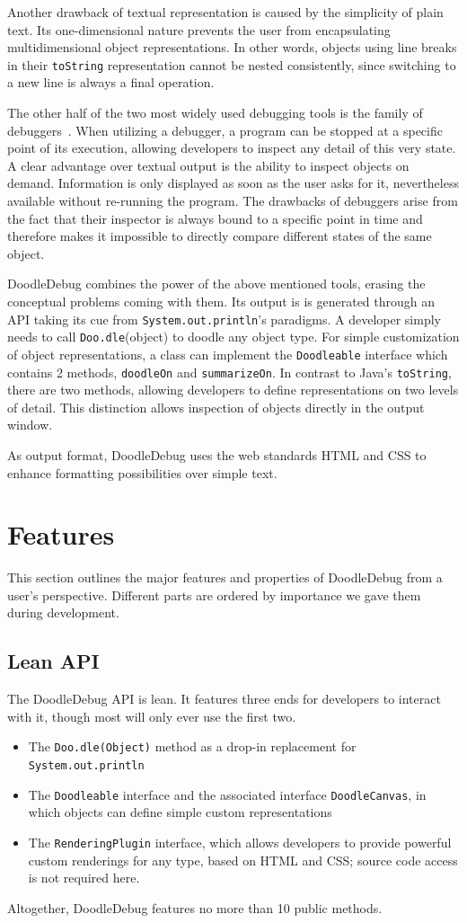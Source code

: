\documentclass[english]{scrartcl}
\newcommand{\DD}{Dood\-le\-De\-bug\xspace}
\newcommand{\Doodle}{\texttt{Doo.\-dle}\xspace}
\newcommand{\println}{\texttt{Sys\-tem.\-out.\-println}\xspace}
\begin{document}
Another drawback of textual representation is caused by the simplicity of plain text.
Its one-dimensional nature prevents the user from encapsulating multidimensional object representations.
In other words, objects using line breaks in their \texttt{toString} representation cannot be nested consistently, since switching to a new line is always a final operation.

The other half of the two most widely used debugging tools is the family of debuggers~\cite{Kras88a}.
When utilizing a debugger, a program can be stopped at a specific point of its execution, allowing developers to inspect any detail of this very state.
A clear advantage over textual output is the ability to inspect objects on demand.
Information is only displayed as soon as the user asks for it, nevertheless available without re-running the program.
The drawbacks of debuggers arise from the fact that their inspector is always bound to a specific point in time and therefore makes it impossible to directly compare different states of the same object.

\DD combines the power of the above mentioned tools, erasing the conceptual problems coming with them.
Its output is is generated through an API taking its cue from \println's paradigms.
A developer simply needs to call \Doodle(object) to doodle any object type.
For simple customization of object representations, a class can implement the \texttt{Doodleable} interface which contains 2 methods, \texttt{doodleOn} and \texttt{summarizeOn}.
In contrast to Java's \texttt{toString}, there are two methods, allowing developers to define representations on two levels of detail.
This distinction allows inspection of objects directly in the output window.

As output format, \DD uses the web standards HTML and CSS to enhance formatting possibilities over simple text.


\section{Features}
This section outlines the major features and properties of DoodleDebug from a user's perspective.
Different parts are ordered by importance we gave them during development.

\subsection{Lean API}
The \DD API is lean.
It features three ends for developers to interact with it, though most will only ever use the first two.
\begin{itemize}
\item The \texttt{Doo.dle(Object)} method as a drop-in replacement for \println
\item The \texttt{Doodleable} interface and the associated interface \texttt{DoodleCanvas}, in which objects can define simple custom representations
\item The \texttt{RenderingPlugin} interface, which allows developers to provide powerful custom renderings for any type, based on HTML and CSS; source code access is not required here.
\end{itemize}
Altogether, \DD features no more than 10 public methods.
\end{document}
